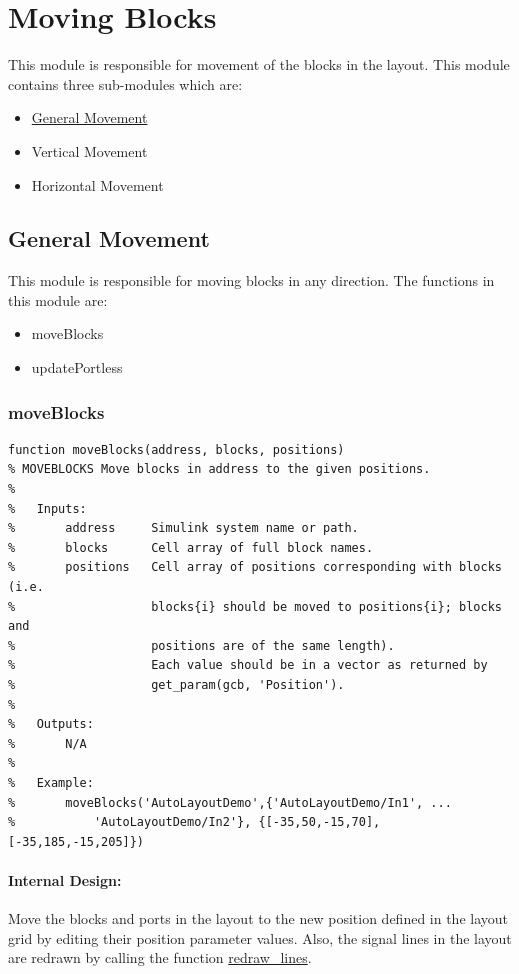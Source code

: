 \documentclass[12pt,letterpaper]{report}
\begin{document}
\section{Moving Blocks}
\par This module is responsible for movement of the blocks in the layout. This module contains three sub-modules which are:
\begin{itemize}
	\item \hyperlink{General Movement}{General Movement}
	\item Vertical Movement
	\item Horizontal Movement
\end{itemize}

\subsection{General Movement} \label{General Movement}
\par This module is responsible for moving blocks in any direction. The functions in this module are:
\begin{itemize}
	\item moveBlocks
	\item updatePortless
\end{itemize}

\subsubsection{moveBlocks} \label{moveBlocks}
\begin{lstlisting}
function moveBlocks(address, blocks, positions)
% MOVEBLOCKS Move blocks in address to the given positions.
%
%   Inputs:
%       address     Simulink system name or path.
%       blocks      Cell array of full block names.
%       positions   Cell array of positions corresponding with blocks (i.e.
%                   blocks{i} should be moved to positions{i}; blocks and
%                   positions are of the same length).
%                   Each value should be in a vector as returned by
%                   get_param(gcb, 'Position').
%
%   Outputs:
%       N/A
%
%   Example:
%       moveBlocks('AutoLayoutDemo',{'AutoLayoutDemo/In1', ...
%           'AutoLayoutDemo/In2'}, {[-35,50,-15,70],[-35,185,-15,205]})
\end{lstlisting}
\paragraph{Internal Design:} Move the blocks and ports in the layout to the new position defined in the layout grid by editing their position parameter values. Also, the signal lines in the layout are redrawn by calling the function \hyperref[redraw_lines]{redraw\_lines}.
\end{document}

